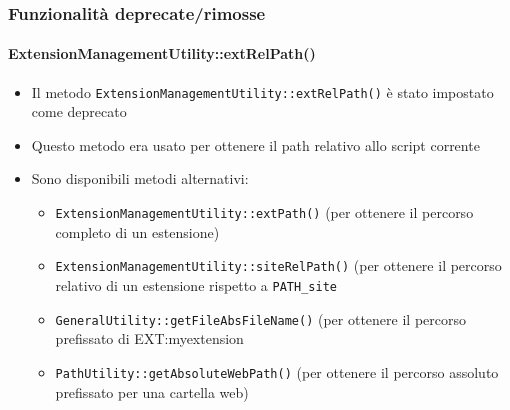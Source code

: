 \begin{frame}[fragile]
	\frametitle{Funzionalità deprecate/rimosse}
	\framesubtitle{ExtensionManagementUtility::extRelPath()}

	\begin{itemize}

		\item Il metodo \texttt{ExtensionManagementUtility::extRelPath()} è stato impostato come deprecato
		\item Questo metodo era usato per ottenere il path relativo allo script corrente
		\item Sono disponibili metodi alternativi:

			\begin{itemize}
				\item \texttt{ExtensionManagementUtility::extPath()}\newline
					(per ottenere il percorso completo di un estensione)
				\item \texttt{ExtensionManagementUtility::siteRelPath()}\newline
					(per ottenere il percorso relativo di un estensione rispetto a \texttt{PATH\_site}
				\item \texttt{GeneralUtility::getFileAbsFileName()}\newline
					(per ottenere il percorso prefissato di EXT:myextension
				\item \texttt{PathUtility::getAbsoluteWebPath()}\newline
					(per ottenere il percorso assoluto prefissato per una cartella web)
			\end{itemize}

	\end{itemize}

\end{frame}


